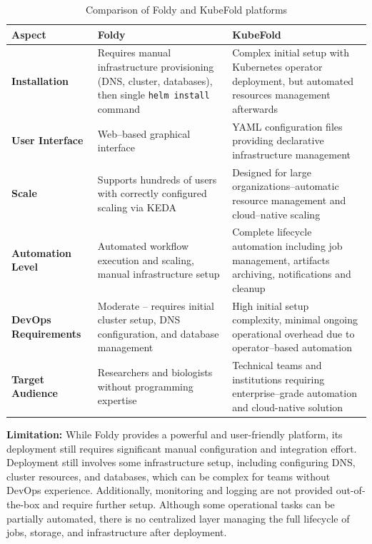 \begin{table}[htbp]
\centering
\caption{Comparison of Foldy and KubeFold platforms}
\label{tab:foldy-kubefold-comparison}
\begin{tabular}{|l|p{5.5cm}|p{5.5cm}|}
\hline
\textbf{Aspect} & \textbf{Foldy} & \textbf{KubeFold} \\
\hline
\textbf{Installation} & 
Requires manual infrastructure provisioning (DNS, cluster, databases), then single \texttt{helm install} command & 
Complex initial setup with Kubernetes operator deployment, but automated resources management afterwards \\
\hline
\textbf{User Interface} & 
Web--based graphical interface & 
YAML configuration files providing declarative infrastructure management \\
\hline
\textbf{Scale} & 
Supports hundreds of users with correctly configured scaling via KEDA & 
Designed for large organizations--automatic resource management and cloud--native scaling \\
\hline
\textbf{Automation Level} & 
Automated workflow execution and scaling, manual infrastructure setup & 
Complete lifecycle automation including job management, artifacts archiving, notifications and cleanup \\
\hline
\textbf{DevOps Requirements} & 
Moderate -- requires initial cluster setup, DNS configuration, and database management & 
High initial setup complexity, minimal ongoing operational overhead due to operator--based automation \\
\hline
\textbf{Target Audience} & 
Researchers and biologists without programming expertise & 
Technical teams and institutions requiring enterprise--grade automation and cloud-native solution \\
\hline
\end{tabular}
\end{table}

\textbf{Limitation:} While Foldy provides a powerful and user-friendly platform, its deployment still requires significant manual configuration and integration effort.
Deployment still involves some infrastructure setup, including configuring DNS, cluster resources, and databases, which can be complex for teams without DevOps experience.
Additionally, monitoring and logging are not provided out-of-the-box and require further setup.
Although some operational tasks can be partially automated, there is no centralized layer managing the full lifecycle of jobs, storage, and infrastructure after deployment.

